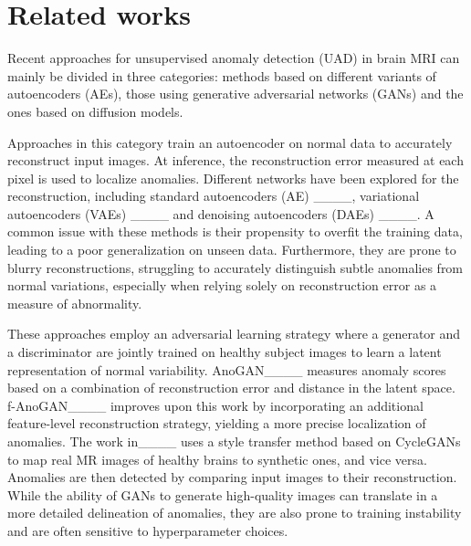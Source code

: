 \section{Related works}
Recent approaches for unsupervised anomaly detection (UAD) in brain MRI can mainly be divided in three categories: methods based on different variants of autoencoders (AEs), those using generative adversarial networks (GANs) and the ones based on diffusion models. 


 Approaches in this category train an autoencoder on normal data to accurately reconstruct input images. At inference, the reconstruction error measured at each pixel is used to localize anomalies. Different networks have been explored for the reconstruction, including standard autoencoders (AE) ____, variational autoencoders (VAEs) ____ and denoising autoencoders (DAEs) ____. A common issue with these methods is their propensity to overfit the training data, leading to a poor generalization on unseen data. Furthermore, they are prone to blurry reconstructions, struggling to accurately distinguish subtle anomalies from normal variations, especially when relying solely on reconstruction error as a measure of abnormality.

 These approaches employ an adversarial learning strategy where a generator and a discriminator are jointly trained on healthy subject images to learn a latent representation of normal variability. AnoGAN____ measures anomaly scores based on a combination of reconstruction error and distance in the latent space. f-AnoGAN____ improves upon this work by incorporating an additional feature-level reconstruction strategy, yielding a more precise localization of anomalies. The work in____ uses a style transfer method based on CycleGANs to map real MR images of healthy brains to synthetic ones, and vice versa. Anomalies are then detected by comparing input images to their reconstruction. While the ability of GANs to generate high-quality images can translate in a more detailed delineation of anomalies, they are also prone to training instability and are often sensitive to hyperparameter choices.

